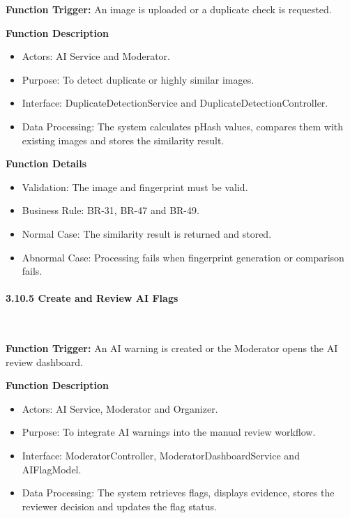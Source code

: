 \textbf{Function Trigger:} An image is uploaded or a duplicate check is requested.

\textbf{Function Description}
\begin{itemize}[leftmargin=1.5em, nosep]
    \item Actors: AI Service and Moderator.
    \item Purpose: To detect duplicate or highly similar images.
    \item Interface: DuplicateDetectionService and DuplicateDetectionController.
    \item Data Processing: The system calculates pHash values, compares them with existing images and stores the similarity result.
\end{itemize}

\textbf{Function Details}
\begin{itemize}[leftmargin=1.5em, nosep]
    \item Validation: The image and fingerprint must be valid.
    \item Business Rule: BR-31, BR-47 and BR-49.
    \item Normal Case: The similarity result is returned and stored.
    \item Abnormal Case: Processing fails when fingerprint generation or comparison fails.
\end{itemize}

\paragraph*{3.10.5 Create and Review AI Flags}\leavevmode\\[-0.5em]
\label{par:create-review-ai-flags}

\textbf{Function Trigger:} An AI warning is created or the Moderator opens the AI review dashboard.

\textbf{Function Description}
\begin{itemize}[leftmargin=1.5em, nosep]
    \item Actors: AI Service, Moderator and Organizer.
    \item Purpose: To integrate AI warnings into the manual review workflow.
    \item Interface: ModeratorController, ModeratorDashboardService and AIFlagModel.
    \item Data Processing: The system retrieves flags, displays evidence, stores the reviewer decision and updates the flag status.
\end{itemize}

